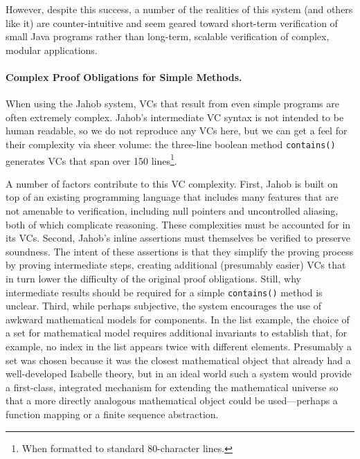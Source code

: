 However, despite this success, a number of the realities of this system (and others like it) are counter-intuitive and seem geared toward short-term verification of small Java programs rather than long-term, scalable verification of complex, modular applications.

\paragraph{Complex Proof Obligations for Simple Methods.\label{sec:jahobComplexVCs}}
When using the Jahob system, VCs that result from even simple programs are often extremely complex. Jahob's intermediate VC syntax is not intended to be human readable, so we do not reproduce any VCs here, but we can get a feel for their complexity via sheer volume: the three-line boolean method \texttt{contains()} generates VCs that span over 150 lines\footnote{When formatted to standard 80-character lines.}.  

A number of factors contribute to this VC complexity.  First, Jahob is built on top of an existing programming language that includes many features that are not amenable to verification, including null pointers and uncontrolled aliasing, both of which complicate reasoning\cite{weideVerificationReferences}.  These complexities must be accounted for in its VCs.  Second, Jahob's inline assertions must themselves be verified to preserve soundness.  The intent of these assertions is that they simplify the proving process by proving intermediate steps, creating additional (presumably easier) VCs that in turn lower the difficulty of the original proof obligations.  Still, why intermediate results should be required for a simple \texttt{contains()} method is unclear.  Third, while perhaps subjective, the system encourages the use of awkward mathematical models for components.  In the list example, the choice of a set for mathematical model requires additional invariants to establish that, for example, no index in the list appears twice with different elements.  Presumably a set was chosen because it was the closest mathematical object that already had a well-developed Isabelle theory, but in an ideal world such a system would provide a first-class, integrated mechanism for extending the mathematical universe so that a more directly analogous mathematical object could be used---perhaps a function mapping or a finite sequence abstraction.

